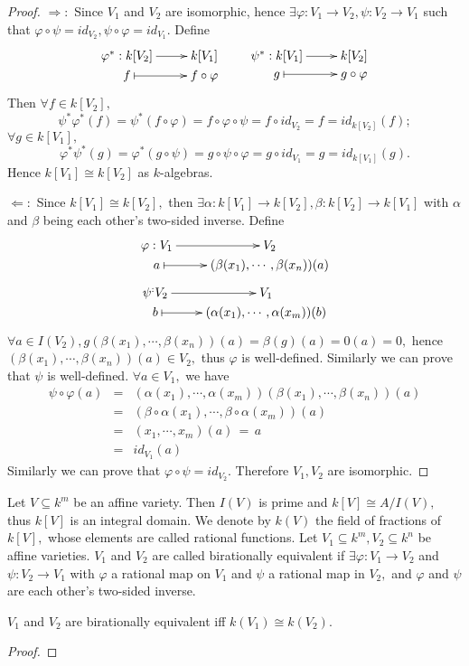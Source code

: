 \begin{proof}
$\Longrightarrow:$ Since $V_1$ and $V_2$ are isomorphic, hence
$\exists \varphi:V_1\rightarrow V_2,\psi:V_2\rightarrow V_1$ such
that $\varphi\circ\psi=id_{V_2},\psi\circ\varphi=id_{V_1}.$ Define
\[ \xymatrix@R=0em{
   {\varphi^{\ast}:k[V_2]} \ar[r] & k[V_1]   \\
   f \ar@{|->}[r] & {f\circ\varphi} } \qquad
   \xymatrix@R=0em{
   {\psi^{\ast}:k[V_1]} \ar[r] & k[V_2]   \\
   g \ar@{|->}[r] & {g\circ\varphi} }
\]
Then $\forall f\in k[V_2],$
$$\psi^{\ast}\varphi^{\ast}(f)=\psi^{\ast}(f\circ\varphi)=f\circ\varphi\circ\psi=f\circ id_{V_2}=f=id_{k[V_2]}(f);$$
$\forall g\in k[V_1],$
$$\varphi^{\ast}\psi^{\ast}(g)=\varphi^{\ast}(g\circ\psi)=g\circ\psi\circ\varphi=g\circ id_{V_1}=g=id_{k[V_1]}(g).$$
Hence $k[V_1]\cong k[V_2]$ as $k$-algebras.

$\Longleftarrow:$ Since $k[V_1]\cong k[V_2],$ then $\exists
\alpha:k[V_1]\rightarrow k[V_2], \beta:k[V_2]\rightarrow k[V_1]$
with $\alpha$ and $\beta$ being each other's two-sided inverse.
Define
\[ \xymatrix@R=0em{
   {\varphi:V_1} \ar[r] & V_2                           \\
   a \ar@{|->}[r] & {(\beta(x_1),\cdots,\beta(x_n))(a)} }
\]
\[   \xymatrix@R=0em{
   {\psi^:V_2} \ar[r] & V_1                              \\
   b \ar@{|->}[r] & {(\alpha(x_1),\cdots,\alpha(x_m))(b)} }
\]
$\forall a\in I(V_2),
g(\beta(x_1),\cdots,\beta(x_n))(a)=\beta(g)(a)=0(a)=0,$ hence
$(\beta(x_1),\cdots,\beta(x_n))(a)\in V_2,$ thus $\varphi$ is
well-defined. Similarly we can prove that $\psi$ is well-defined.
$\forall a\in V_1,$ we have
\begin{eqnarray*}
\psi\circ\varphi(a) & = &
(\alpha(x_1),\cdots,\alpha(x_m))(\beta(x_1),\cdots,\beta(x_n))(a)\\
& = & (\beta\circ\alpha(x_1),\cdots,\beta\circ\alpha(x_m))(a)    \\
& = & (x_1,\cdots,x_m)(a)\,=\,a                                  \\
& = & id_{V_1}(a)
\end{eqnarray*}
Similarly we can prove that $\varphi\circ\psi=id_{V_2}.$ Therefore
$V_1,V_2$ are isomorphic.
\end{proof}
Let $V\subseteq k^m$ be an affine variety. Then $I(V)$ is prime and
$k[V]\cong A/I(V),$ thus $k[V]$ is an integral domain. We denote by
$k(V)$ the field of fractions of $k[V],$ whose elements are called
rational functions. Let $V_1\subseteq k^m,V_2\subseteq k^n$ be
affine varieties. $V_1$ and $V_2$ are called birationally equivalent
if $\exists \varphi: V_1\rightarrow V_2$ and $\psi:V_2\rightarrow
V_1$ with $\varphi$ a rational map on $V_1$ and $\psi$ a rational
map in $V_2,$ and $\varphi$ and $\psi$ are each other's two-sided
inverse.
\begin{thm}
$V_1$ and $V_2$ are birationally equivalent iff $k(V_1)\cong
k(V_2).$
\end{thm}
\begin{proof}

\end{proof}

